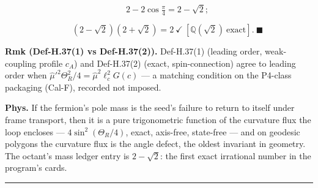 \begin{theorem}
\[
\qquad 2-2\cos\tfrac\pi4=2-\sqrt2;
\]

\[
\qquad (2-\sqrt2)(2+\sqrt2)=2\ \checkmark\ [\mathbb Q(\sqrt2)\ \text{exact}].\ \blacksquare
\]

\textbf{Rmk (Def-H.37(1) vs Def-H.37(2)).} Def-H.37(1) (leading order, weak-coupling profile $c_A$) and Def-H.37(2) (exact, spin-connection) agree to leading order when $\hat\mu'^2\Theta_R^2/4=\hat\mu^2\ell_c^2G(c)$ — a matching condition on the P4-class packaging (Cal-F), recorded not imposed.

\textbf{Phys.} If the fermion's pole mass is the seed's failure to return to itself under frame transport, then it is a pure trigonometric function of the curvature flux the loop encloses — $4\sin^2(\Theta_R/4)$, exact, axis-free, state-free — and on geodesic polygons the curvature flux is the angle defect, the oldest invariant in geometry. The octant's mass ledger entry is $2-\sqrt2$: the first exact irrational number in the program's cards.

\vspace{2pt}\noindent\rule{\textwidth}{0.4pt}\vspace{2pt}

\end{theorem}

